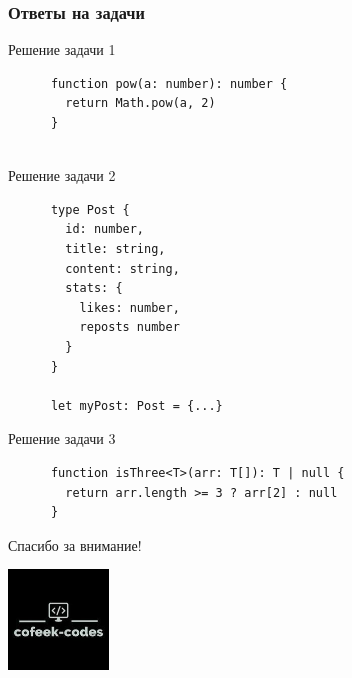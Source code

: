 \documentclass[aspectratio=169]{beamer}
\begin{document}
\begin{frame}

  \frametitle{Ответы на задачи}
  
  \begin{block}{Решение задачи 1}
    \begin{verbatim}
      function pow(a: number): number {
        return Math.pow(a, 2)
      }
      
    \end{verbatim}
    
  \end{block}

  \begin{block}{Решение задачи 2}
    \begin{verbatim}
      type Post {
        id: number,
        title: string,
        content: string,
        stats: {
          likes: number,
          reposts number
        }
      }

      let myPost: Post = {...} 
    \end{verbatim}
    
  \end{block}

  \begin{block}{Решение задачи 3}
    \begin{verbatim}
      function isThree<T>(arr: T[]): T | null {
        return arr.length >= 3 ? arr[2] : null
      }

    \end{verbatim}
    
  \end{block}
  

\end{frame}


\begin{frame}

  \begin{center}
    \large {Спасибо за внимание!}
    
\bigskip
\bigskip
\bigskip

    \includegraphics[width=0.2\textwidth]{assets/avatar.jpg}
  \end{center}
  
  \end{frame}
\end{document}
